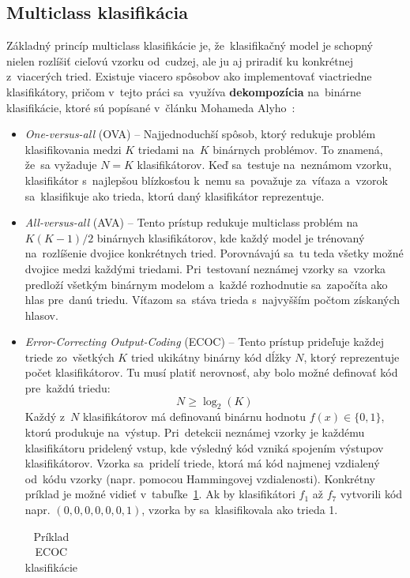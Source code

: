 \subsection{Multiclass klasifikácia}\label{des:multiclass}
Základný princíp multiclass klasifikácie je, že~klasifikačný model je schopný nielen rozlíšiť cieľovú vzorku od~cudzej, ale ju aj priradiť ku konkrétnej z~viacerých tried. Existuje viacero spôsobov ako implementovať viactriedne klasifikátory, pričom v~tejto práci sa~využíva \textbf{dekompozícia} na~binárne klasifikácie, ktoré sú popísané v~článku Mohameda Alyho~\cite{multiclass_classification}:
\begin{itemize}
    \item \textit{One-versus-all}\label{des:OVA} (OVA) -- Najjednoduchší spôsob, ktorý redukuje problém klasifikovania medzi $K$ triedami na~$K$ binárnych problémov. To znamená, že~sa vyžaduje $N = K$ klasifikátorov. Keď sa~testuje na~neznámom vzorku, klasifikátor s~najlepšou blízkosťou k~nemu sa~považuje za~víťaza a~vzorok sa~klasifikuje ako trieda, ktorú daný klasifikátor reprezentuje.
    \item \textit{All-versus-all} (AVA) -- Tento prístup redukuje multiclass problém na~$K(K-1)/2$ binárnych klasifikátorov, kde každý model je trénovaný na~rozlíšenie dvojice konkrétnych tried. Porovnávajú sa~tu teda všetky možné dvojice medzi každými triedami. Pri~testovaní neznámej vzorky sa~vzorka predloží všetkým binárnym modelom a~každé rozhodnutie sa~započíta ako hlas pre~danú triedu. Víťazom sa~stáva trieda s~najvyšším počtom získaných hlasov.
    \item \textit{Error-Correcting Output-Coding} (ECOC) -- Tento prístup prideľuje každej triede zo~všetkých $K$ tried ukikátny binárny kód dĺžky $N$, ktorý reprezentuje počet klasifikátorov. Tu musí platiť nerovnosť, aby bolo možné definovať kód pre~každú triedu:
    $$N \geq \log_{2}(K)$$
    Každý z~$N$ klasifikátorov má definovanú binárnu hodnotu $f(x) \in \{0,1\}$, ktorú produkuje na~výstup. Pri~detekcii neznámej vzorky je každému klasifikátoru pridelený vstup, kde výsledný kód vzniká spojením výstupov klasifikátorov. Vzorka sa~pridelí triede, ktorá má kód najmenej vzdialený od~kódu vzorky (napr. pomocou Hammingovej vzdialenosti). Konkrétny príklad je možné vidieť v~tabuľke~\ref{tab:ECOC}. Ak by klasifikátori $f_1$ až $f_7$ vytvorili kód napr. $(0,0,0,0,0,0,1)$, vzorka by sa~klasifikovala ako trieda 1.
    \begin{table}[H]
    \caption{Príklad ECOC klasifikácie}
    \label{tab:ECOC}
    \centering
    \begin{tabular}{|c|c|c|c|c|c|c|c|}

\end{tabular}
\end{table}
\end{itemize}
